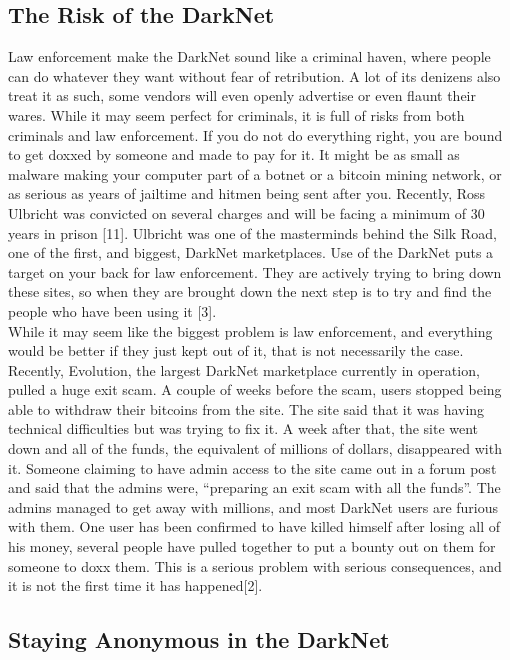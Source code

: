 \documentclass[twocolumn,letterpaper,10pt]{article}
\begin{document}
\subsection{The Risk of the DarkNet}

Law enforcement make the DarkNet sound like a criminal haven, where people can do whatever they want without fear of retribution. A lot of its denizens also treat it as such, some vendors will even openly advertise or even flaunt their wares. While it may seem perfect for criminals, it is full of risks from both criminals and law enforcement. If you do not do everything right, you are bound to get doxxed by someone and made to pay for it. It might be as small as malware making your computer part of a botnet or a bitcoin mining network, or as serious as years of jailtime and hitmen being sent after you. Recently, Ross Ulbricht was convicted on several charges and will be facing a minimum of 30 years in prison [11]. Ulbricht was one of the masterminds behind the Silk Road, one of the first, and biggest, DarkNet marketplaces. Use of the DarkNet puts a target on your back for law enforcement. They are actively trying to bring down these sites, so when they are brought down the next step is to try and find the people who have been using it [3].\\
\indent While it may seem like the biggest problem is law enforcement, and everything would be better if they just kept out of it, that is not necessarily the case. Recently, Evolution, the largest DarkNet marketplace currently in operation, pulled a huge exit scam. A couple of weeks before the scam, users stopped being able to withdraw their bitcoins from the site. The site said that it was having technical difficulties but was trying to fix it. A week after that, the site went down and all of the funds, the equivalent of millions of dollars, disappeared with it. Someone claiming to have admin access to the site came out in a forum post and said that the admins were, “preparing an exit scam with all the funds”. The admins managed to get away with millions, and most DarkNet users are furious with them. One user has been confirmed to have killed himself after losing all of his money, several people have pulled together to put a bounty out on them for someone to doxx them. This is a serious problem with serious consequences, and it is not the first time it has happened[2].

\subsection{Staying Anonymous in the DarkNet}
\end{document}

